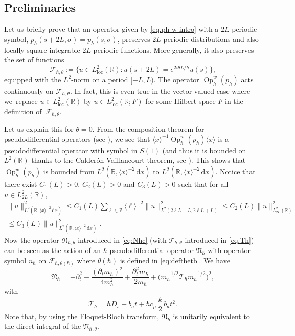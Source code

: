 \documentclass[JEP,XML,SOM,Unicode,NoFloatCountersInSection,published]{cedram}
\let\sep:
\newcommand{\rd}{\,\mathrm{d}}
\newcommand{\loc}{\mathrm{loc}}
\DeclareMathOperator{\Op}{Op}
\theoremstyle{plain}
\theoremstyle{definition}
\newcommand{\R}{\mathbb{R}}
\begin{document}
\subsection{Preliminaries}\label{s-sec.p}
Let us briefly prove that an operator given by \eqref{eq.ph-w-intro} with a $2L$ periodic symbol, $p_{\hbar}(s+2L,\sigma)=p_{\hbar}(s,\sigma)$, preserves $2L$-periodic distributions and also locally square integrable $2L$-periodic functions. More generally, it also preserves the set of functions
\begin{equation}\label{eq.Fthetah}
\mathscr{F}_{\hbar,\theta}:=\{u\in L^2_{\loc}(\mathbb{R}) \sep u(s+2L)=e^{2i\theta L/\hbar}u(s)\},
\end{equation}
equipped with the $L^2$-norm on a period $[-L,L)$. The operator $\Op_\hbar^w(p_\hbar)$ acts \hbox{continuously} on $\mathscr{F}_{\hbar,\theta}$.
In fact, this is even true in the vector valued case where we~replace $u\in L^2_{\loc}(\mathbb{R})$ by $u\in L^2_{\loc}(\mathbb{R};F)$ for some Hilbert space $F$ in the definition of~$\mathscr{F}_{\hbar,\theta}$.

Let us explain this for $\theta=0$.
From the composition theorem for pseudodifferential operators (see \cite[Th.\,4.18]{Zworski}), we see that $\langle x\rangle^{-1}\Op_\hbar^w(p_\hbar)\langle x\rangle$ is a pseudodifferential operator with symbol in $S(1)$ (and thus it is bounded on $L^2(\R)$ thanks to the Calderón-Vaillancourt theorem, see \cite[Th.\,4.23]{Zworski}). This shows that $\Op_\hbar^w(p_\hbar)$ is bounded from $L^2(\R,\langle x\rangle^{-2}\rd x)$ to $L^2(\R,\langle x\rangle^{-2}\rd x)$. Notice that there exist $C_1(L)>0$, $C_2(L)>0$ and $C_3(L)>0$ such that for all $u\in L^2_{2L}(\R)$,
\begin{multline*}
\|u\|^2_{L^2(\R,\langle x\rangle^{-2}\rd x)} \leq C_1(L) \sum_{\ell \in \mathbb Z} \langle\ell\rangle^{-2} \| u\|^2_{L^2(2 \ell L - L ,2\ell L + L)} \leq C_2(L) \|u\|^2_{L^2_{2L}(\R)}\\
\leq C_3(L)\|u\|^2_{L^2(\R,\langle x\rangle^{-2}\rd x)} .
\end{multline*}
Now the operator $\mathfrak{N}_{\hbar,\theta}$ introduced in \eqref{eq:Nhc} (with $\mathcal T_{\hbar,\theta}$ introduced in \eqref{eq.Th}) can be seen as the action of an $\hbar$-pseudodifferential operator $\mathfrak{N}_\hbar$ with operator symbol $n_{\hbar}$ on $\mathscr{F}_{\hbar,\theta(\hbar)}$ where $\theta(\hbar)$ is defined in \eqref{eq:defthetb}. We have
\begin{equation}\label{eq:N0}
\mathfrak N_{\hbar}=-\partial^2_t-\frac{(\partial_tm_\hbar)^2}{4m^2_\hbar}+\frac{\partial^2_tm_\hbar}{2m_\hbar}+\bigl(m_\hbar^{-1/2} \mathcal T_{\hbar} m_\hbar^{-1/2}\bigr)^2,
\end{equation}
with
\[
\mathcal T_{\hbar}= \hbar D_s-b_at+\hbar c_\mu\,\frac{k}{2}\,b_at^2.
\]
Note that, by using the Floquet-Bloch transform, $\mathfrak{N}_\hbar$ is unitarily equivalent to the direct integral of the $\mathfrak{N}_{\hbar,\theta}$.
\end{document}
